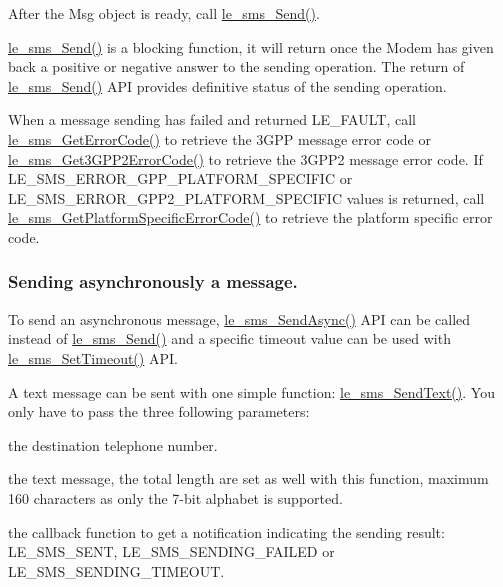 After the Msg object is ready, call {\ttfamily \hyperlink{le__sms__interface_8h_ab7dee7d2c74cfcadd9ea0d5fe1786dfc}{le\+\_\+sms\+\_\+\+Send()}}.

{\ttfamily \hyperlink{le__sms__interface_8h_ab7dee7d2c74cfcadd9ea0d5fe1786dfc}{le\+\_\+sms\+\_\+\+Send()}} is a blocking function, it will return once the Modem has given back a positive or negative answer to the sending operation. The return of {\ttfamily \hyperlink{le__sms__interface_8h_ab7dee7d2c74cfcadd9ea0d5fe1786dfc}{le\+\_\+sms\+\_\+\+Send()}} A\+P\+I provides definitive status of the sending operation.

When a message sending has failed and returned L\+E\+\_\+\+F\+A\+U\+L\+T, call \hyperlink{le__sms__interface_8h_a9ee511af99c91383344debf532fae1ae}{le\+\_\+sms\+\_\+\+Get\+Error\+Code()} to retrieve the 3\+G\+P\+P message error code or \hyperlink{le__sms__interface_8h_a46afe91bbded617ad444ea29a9dd910a}{le\+\_\+sms\+\_\+\+Get3\+G\+P\+P2\+Error\+Code()} to retrieve the 3\+G\+P\+P2 message error code. If L\+E\+\_\+\+S\+M\+S\+\_\+\+E\+R\+R\+O\+R\+\_\+G\+P\+P\+\_\+\+P\+L\+A\+T\+F\+O\+R\+M\+\_\+\+S\+P\+E\+C\+I\+F\+I\+C or L\+E\+\_\+\+S\+M\+S\+\_\+\+E\+R\+R\+O\+R\+\_\+G\+P\+P2\+\_\+\+P\+L\+A\+T\+F\+O\+R\+M\+\_\+\+S\+P\+E\+C\+I\+F\+I\+C values is returned, call \hyperlink{le__sms__interface_8h_a9cfbc2131df38f99272a71bf05cb1254}{le\+\_\+sms\+\_\+\+Get\+Platform\+Specific\+Error\+Code()} to retrieve the platform specific error code.\hypertarget{c_sms_le_sms_ops_async_sending}{}\subsubsection{Sending asynchronously a message.}\label{c_sms_le_sms_ops_async_sending}
To send an asynchronous message, \hyperlink{le__sms__interface_8h_a0ba61dcf10157e9982702373577c6b45}{le\+\_\+sms\+\_\+\+Send\+Async()} A\+P\+I can be called instead of \hyperlink{le__sms__interface_8h_ab7dee7d2c74cfcadd9ea0d5fe1786dfc}{le\+\_\+sms\+\_\+\+Send()} and a specific timeout value can be used with \hyperlink{le__sms__interface_8h_a2b14febf0e2285b0b3c2dbcd1c2bb7b0}{le\+\_\+sms\+\_\+\+Set\+Timeout()} A\+P\+I.

A text message can be sent with one simple function\+: \hyperlink{le__sms__interface_8h_a4bf9a993afcf06f8e9927b534ef9861c}{le\+\_\+sms\+\_\+\+Send\+Text()}. You only have to pass the three following parameters\+:
\begin{DoxyItemize}
\item the destination telephone number.
\item the text message, the total length are set as well with this function, maximum 160 characters as only the 7-\/bit alphabet is supported.
\item the callback function to get a notification indicating the sending result\+: L\+E\+\_\+\+S\+M\+S\+\_\+\+S\+E\+N\+T, L\+E\+\_\+\+S\+M\+S\+\_\+\+S\+E\+N\+D\+I\+N\+G\+\_\+\+F\+A\+I\+L\+E\+D or L\+E\+\_\+\+S\+M\+S\+\_\+\+S\+E\+N\+D\+I\+N\+G\+\_\+\+T\+I\+M\+E\+O\+U\+T.
\end{DoxyItemize}

